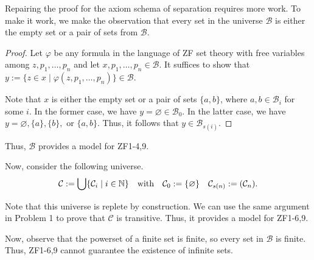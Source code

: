 \documentclass[a4paper]{article}
\newcommand{\N}{\mathbb{N}}
\let\P\relax
\newcommand{\P}{\mathcal{P}}
\newcommand{\B}{\mathcal{B}}
\newcommand{\C}{\mathcal{C}}
\begin{document}
Repairing the proof for the axiom schema of separation requires more work.
To make it work, we make the observation that every set in the universe $\B$ is either the empty set or a pair of sets from $\B$.
\begin{proof}
  Let $\varphi$ be any formula in the language of ZF set theory with free variables among $z,p_{1},\ldots,p_{n}$ and let $x,p_{1},\ldots,p_{n} \in \B$.
  It suffices to show that $y := \{z \in x \mid \varphi(z,p_{1},\ldots,p_{n})\} \in \B$.

  Note that $x$ is either the empty set or a pair of sets $\{a,b\}$, where $a,b \in \B_{i}$ for some $i$.
  In the former case, we have $y = \varnothing \in \B_{0}$.
  In the latter case, we have $y = \varnothing, \{a\}, \{b\}, \text{ or }\{a,b\}$.
  Thus, it follows that $y \in \B_{s(i)}$.
\end{proof}
Thus, $\B$ provides a model for ZF1-4,9.

Now, consider the following universe.
\begin{align*}
  \C := \bigcup\{\C_{i} \mid i \in \N\} && \text{with} && \C_{0} := \{\varnothing\} && \C_{s(n)} := \P(\C_{n}).
\end{align*}

Note that this universe is replete by construction.
We can use the same argument in Problem 1 to prove that $\C$ is transitive.
Thus, it provides a model for ZF1-6,9.

Now, observe that the powerset of a finite set is finite, so every set in $\B$ is finite.
Thus, ZF1-6,9 cannot guarantee the existence of infinite sets.

\end{document}
